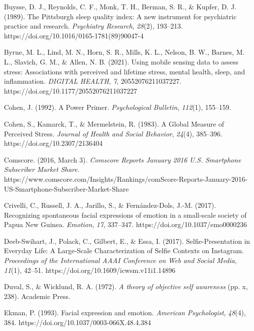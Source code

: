 \documentclass[authordate, empirical]{jote-new-article}
\begin{document}
Buysse, D. J., Reynolds, C. F., Monk, T. H., Berman, S. R., \& Kupfer, D. J. (1989). The Pittsburgh sleep quality index: A new instrument for psychiatric practice and research. \emph{Psychiatry Research}, \emph{28}(2), 193--213. https://doi.org/10.1016/0165-1781(89)90047-4



Byrne, M. L., Lind, M. N., Horn, S. R., Mills, K. L., Nelson, B. W., Barnes, M. L., Slavich, G. M., \& Allen, N. B. (2021). Using mobile sensing data to assess stress: Associations with perceived and lifetime stress, mental health, sleep, and inflammation. \emph{DIGITAL HEALTH}, \emph{7}, 20552076211037227. https://doi.org/10.1177/20552076211037227



Cohen, J. (1992). A Power Primer. \emph{Psychological Bulletin}, \emph{112}(1), 155--159.



Cohen, S., Kamarck, T., \& Mermelstein, R. (1983). A Global Measure of Perceived Stress. \emph{Journal of Health and Social Behavior}, \emph{24}(4), 385--396. https://doi.org/10.2307/2136404



Comscore. (2016, March 3). \emph{Comscore}\emph{ Reports January 2016 U.S. Smartphone Subscriber Market Share}. https://www.comscore.com/Insights/Rankings/comScore-Reports-January-2016-US-Smartphone-Subscriber-Market-Share



Crivelli, C., Russell, J. A., Jarillo, S., \& Fernández-Dols, J.-M. (2017). Recognizing spontaneous facial expressions of emotion in a small-scale society of Papua New Guinea. \emph{Emotion}, \emph{17}, 337--347. https://doi.org/10.1037/emo0000236



Deeb-Swihart, J., Polack, C., Gilbert, E., \& Essa, I. (2017). Selfie-Presentation in Everyday Life: A Large-Scale Characterization of Selfie Contexts on Instagram. \emph{Proceedings of the International AAAI Conference on Web and }\emph{Social Media}, \emph{11}(1), 42--51. https://doi.org/10.1609/icwsm.v11i1.14896



Duval, S., \& Wicklund, R. A. (1972). \emph{A theory of objective }\emph{self awareness} (pp. x, 238). Academic Press.



Ekman, P. (1993). Facial expression and emotion. \emph{American Psychologist}, \emph{48}(4), 384. https://doi.org/10.1037/0003-066X.48.4.384
\end{document}
